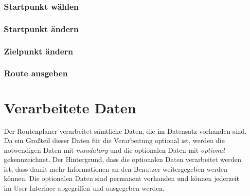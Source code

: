 \documentclass[12pt, a4paper, ngerman]{article}
\begin{document}
\subsubsection{Startpunkt wählen \label{uc:StartpunktWaehlen}}
\begin{usecase}
\end{usecase}

\subsubsection{Startpunkt ändern \label{uc:StartpunktAendern}}
\begin{usecase}
\end{usecase}

\subsubsection{Zielpunkt ändern \label{uc:ZielpunktAendern}}
\begin{usecase}
	\uprecondition{\ref{uc:RouteBerechnen}}
\end{usecase}

\subsubsection{Route ausgeben \label{uc:RouteAusgeben}}
\begin{usecase}
\end{usecase}

\section{Verarbeitete Daten \label{attributBeschreibungen}}
Der Routenplaner verarbeitet sämtliche Daten, die im Datensatz vorhanden sind. Da ein Großteil dieser Daten für die Verarbeitung optional ist, werden die notwendigen Daten mit \textit{mandatory} und die optionalen Daten mit \textit{optional} gekennzeichnet. Der Hintergrund, dass die optionalen Daten verarbeitet werden ist, dass damit mehr Informationen an den Benutzer weitergegeben werden können. Die optionalen Daten sind permanent vorhanden und können jederzeit im User Interface abgegriffen und ausgegeben werden.
\end{document}
